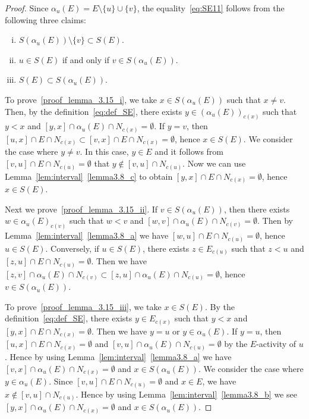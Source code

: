 \documentclass[ALCO,ThmDefs,Unicode,epreuves]{cedram}
\begin{document}
\begin{proof}
Since $\alpha_u(E) = E \setminus \{ u \} \cup \{ v \}$, the equality~\eqref{eq:SE11} 
follows from the following three claims:
\begin{enumerate}[(i)]
\item\label{proof_lemma_3.15_i} %
$S(\alpha_u(E)) \setminus \{ v \} \subset S(E)$.
\item\label{proof_lemma_3.15_ii} %
$u \in S(E)$ if and only if $v \in S(\alpha_u(E))$.
\item\label{proof_lemma_3.15_iii} %
$S(E) \subset S(\alpha_u(E))$.
\end{enumerate}

To prove~\ref{proof_lemma_3.15_i}, we take $x \in S(\alpha_u(E))$ such that $x \neq v$.
Then, by the definition~\eqref{eq:def_SE}, there exists $y \in (\alpha_u(E))_{c(x)}$ such that $y<x$ 
and $[y,x] \cap \alpha_u(E) \cap N_{c(x)} = \emptyset$.
If $y = v$, then $[u,x] \cap E \cap N_{c(x)} \subset [v,x] \cap E \cap N_{c(x)} = \emptyset$, 
hence $x \in S(E)$.
We consider the case where $y \neq v$.
In this case, $y \in E$ and it follows from $[v,u] \cap E \cap N_{c(u)} = \emptyset$ 
that $y \not\in [v,u] \cap N_{c(u)}$.
Now we can use Lemma~\ref{lem:interval}~\ref{lemma3.8_c} to obtain $[y,x] \cap E \cap N_{c(x)} = \emptyset$, 
hence $x \in S(E)$.

Next we prove~\ref{proof_lemma_3.15_ii}.
If $v\in S(\alpha_u(E))$, then there exists $w \in \alpha_u(E)_{c(v)}$ such that 
$w<v$ and $[w,v] \cap \alpha_u(E) \cap N_{c(v)} = \emptyset$.
Then by Lemma~\ref{lem:interval}~\ref{lemma3.8_a} we have $[w,u] \cap E \cap N_{c(u)} = \emptyset$, 
hence $u \in S(E)$.
Conversely, 
if $u \in S(E)$, there exists $z \in E_{c(u)}$ such that $z < u$ and $[z,u] \cap E \cap N_{c(u)} = \emptyset$.
Then we have $[z,v] \cap \alpha_u(E) \cap N_{c(v)} \subset [z,u] \cap \alpha_u(E) \cap N_{c(u)} = \emptyset$, 
hence $v \in S(\alpha_u(E))$.

To prove~\ref{proof_lemma_3.15_iii}, we take $x \in S(E)$.
By the definition~\eqref{eq:def_SE}, 
there exists $y \in E_{c(x)}$ such that $y<x$ and $[y,x] \cap E \cap N_{c(x)} = \emptyset$.
Then we have $y = u$ or $y \in \alpha_u(E)$.
If $y=u$, then $[u,x] \cap E \cap N_{c(x)} = \emptyset$ and 
$[v,u] \cap \alpha_u(E) \cap N_{c(u)} = \emptyset$ by the $E$-activity of $u$.
Hence by using Lemma~\ref{lem:interval}~\ref{lemma3.8_a} we have $[v,x] \cap \alpha_u(E) \cap N_{c(x)} = \emptyset$ 
and $x \in S(\alpha_u(E))$.
We consider the case where $y \in \alpha_u(E)$.
Since $[v,u] \cap E \cap N_{c(u)} = \emptyset$ and $x \in E$, we have $x \not\in [v,u] \cap N_{c(u)}$.
Hence by using Lemma~\ref{lem:interval}~\ref{lemma3.8_b} we see $[y,x] \cap \alpha_u(E) \cap N_{c(x)} = \emptyset$ 
and $x \in S(\alpha_u(E))$.


\end{proof}
\end{document}
